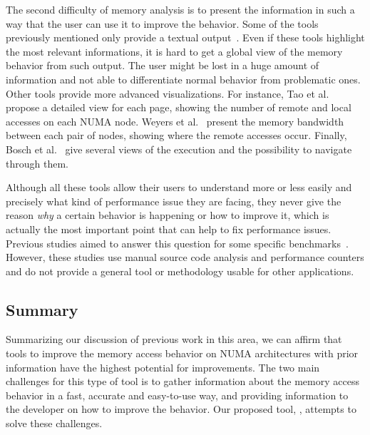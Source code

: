The second difficulty of memory analysis is to present the information in such a
way that the user can use it to improve the behavior. Some of the tools previously mentioned only provide
a textual output~\cite{Lachaize12MemProf,McCurdy2010}. Even if these tools highlight the most relevant informations, it is hard to get a global
view of the memory behavior from such output. The user might be lost in a
huge amount of information and not able to differentiate normal behavior from
problematic ones. Other tools provide more advanced visualizations. For
instance, Tao et al.~\cite{Tao01Visualizing} propose a detailed view for each
page, showing the number of remote and local accesses on each NUMA node. Weyers et
al.~\cite{Weyers14Visualization} present the memory bandwidth between each pair of nodes,
showing where the remote accesses occur. Finally, Bosch et al.~\cite{Bosch00Rivet} give several views of the execution and the possibility to
navigate through them.

Although all these tools allow their users to understand more or less easily and
precisely what kind of performance issue they are facing, they never give the
reason \emph{why} a certain behavior is happening or how to improve it, which is actually the most important point that can help to fix performance issues.
Previous studies aimed to answer this question for some specific
benchmarks~\cite{Majo13(Mis)understanding,Jiang14Understanding}.
However, these studies use manual source code analysis and performance counters and do not provide a general tool or methodology usable for other applications.

\subsection{Summary}

Summarizing our discussion of previous work in this area, we can affirm that tools to improve the memory access behavior on NUMA architectures with prior information have the highest potential for improvements.
The two main challenges for this type of tool is to gather information about the memory access behavior in a fast, accurate and easy-to-use way, and providing information to the developer on how to improve the behavior.
Our proposed tool, \TABARNAC, attempts to solve these challenges.



